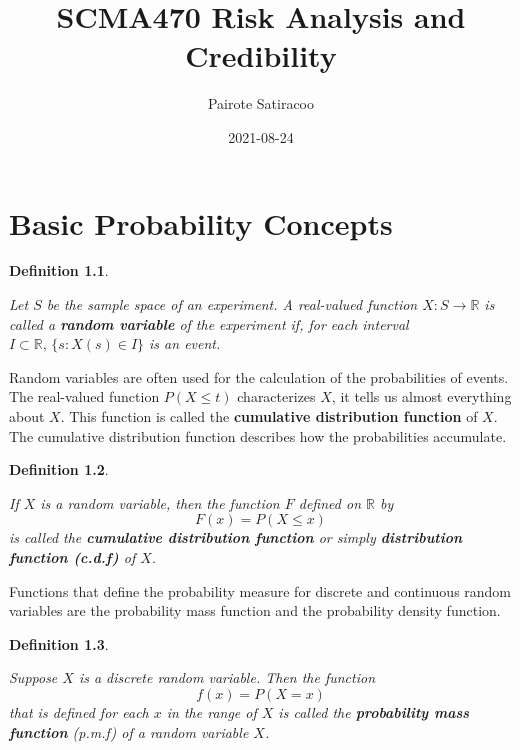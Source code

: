 \documentclass[
]{book}
\title{SCMA470 Risk Analysis and Credibility}
\author{Pairote Satiracoo}
\date{2021-08-24}
\theoremstyle{definition}
\newtheorem{definition}{Definition}[chapter]
\theoremstyle{definition}
\theoremstyle{definition}
\theoremstyle{definition}
\theoremstyle{remark}
\begin{document}
\maketitle

{
\setcounter{tocdepth}{1}
\tableofcontents
}
\hypertarget{basic-probability-concepts}{%
\chapter{Basic Probability Concepts}\label{basic-probability-concepts}}

\begin{definition}
\protect\hypertarget{def:unlabeled-div-1}{}\label{def:unlabeled-div-1}

\emph{Let \(S\) be the sample space of an experiment. A
real-valued function \(X : S \rightarrow \mathbb{R}\) is called a \textbf{random
variable} of the experiment if, for each interval
\(I \subset \mathbb{R}, \, \{s : X(s) \in I \}\) is an event. }

\end{definition}

Random variables are often used for the calculation of the probabilities
of events. The real-valued function \(P(X \le t)\) characterizes \(X\), it
tells us almost everything about \(X\). This function is called the
\textbf{cumulative distribution function} of \(X\). The cumulative distribution
function describes how the probabilities accumulate.

\begin{definition}
\protect\hypertarget{def:unlabeled-div-2}{}\label{def:unlabeled-div-2}

\emph{If \(X\) is a random variable, then the function \(F\)
defined on \(\mathbb{R}\) by \[F(x) = P(X \le x)\] is called the
\textbf{cumulative distribution function} or simply \textbf{distribution function
(c.d.f)} of \(X\).}

\end{definition}

Functions that define the probability measure for discrete and
continuous random variables are the probability mass function and the
probability density function.

\begin{definition}
\protect\hypertarget{def:unlabeled-div-3}{}\label{def:unlabeled-div-3}

\emph{Suppose \(X\) is a discrete random variable. Then the
function \[f(x) = P(X = x)\] that is defined for each \(x\) in the range
of \(X\) is called the \textbf{probability mass function} (p.m.f) of a random
variable \(X\).}

\end{definition}
\end{document}

